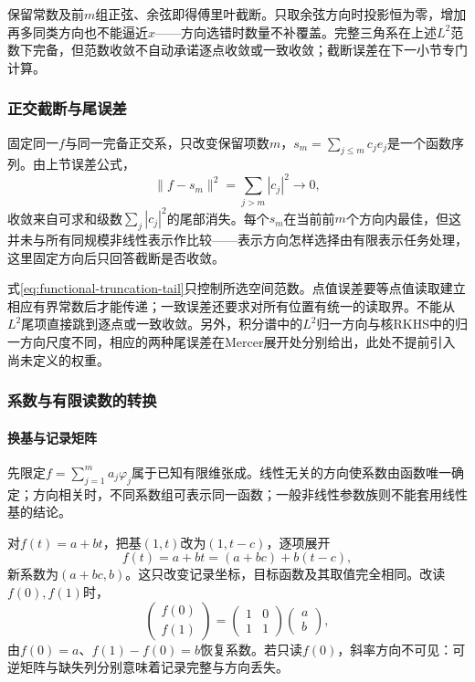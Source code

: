 保留常数及前$m$组正弦、余弦即得傅里叶截断。只取余弦方向时投影恒为零，增加再多同类方向也不能逼近$x$——方向选错时数量不补覆盖。完整三角系在上述$L^2$范数下完备，但范数收敛不自动承诺逐点收敛或一致收敛；截断误差在下一小节专门计算。

\subsubsection{正交截断与尾误差}
\label{subsubsec:truncation-tail}

固定同一$f$与同一完备正交系，只改变保留项数$m$，$s_m=\sum_{j\le m}c_je_j$是一个函数序列。由上节误差公式，
\begin{equation}
\label{eq:functional-truncation-tail}
\|f-s_m\|^2=\sum_{j>m}|c_j|^2\longrightarrow0,
\end{equation}
收敛来自可求和级数$\sum_j|c_j|^2$的尾部消失。每个$s_m$在当前前$m$个方向内最佳，但这并未与所有同规模非线性表示作比较——表示方向怎样选择由有限表示任务处理，这里固定方向后只回答截断是否收敛。

式\eqref{eq:functional-truncation-tail}只控制所选空间范数。点值误差要等点值读取建立相应有界常数后才能传递；一致误差还要求对所有位置有统一的读取界。不能从$L^2$尾项直接跳到逐点或一致收敛。另外，积分谱中的$L^2$归一方向与核RKHS中的归一方向尺度不同，相应的两种尾误差在Mercer展开处分别给出，此处不提前引入尚未定义的权重。

\subsubsection{系数与有限读数的转换}
\label{subsubsec:record-conversion}

\paragraph{换基与记录矩阵}

先限定$f=\sum_{j=1}^m a_j\varphi_j$属于已知有限维张成。线性无关的方向使系数由函数唯一确定；方向相关时，不同系数组可表示同一函数；一般非线性参数族则不能套用线性基的结论。

对$f(t)=a+bt$，把基$(1,t)$改为$(1,t-c)$，逐项展开
\[
f(t)=a+bt=(a+bc)+b(t-c),
\]
新系数为$(a+bc,b)$。这只改变记录坐标，目标函数及其取值完全相同。改读$f(0),f(1)$时，
\[
\begin{pmatrix}f(0)\\f(1)\end{pmatrix}
=\begin{pmatrix}1&0\\1&1\end{pmatrix}\begin{pmatrix}a\\b\end{pmatrix},
\]
由$f(0)=a$、$f(1)-f(0)=b$恢复系数。若只读$f(0)$，斜率方向不可见：可逆矩阵与缺失列分别意味着记录完整与方向丢失。

